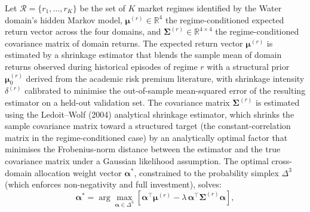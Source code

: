 \documentclass[12pt,openany]{book}
\numberwithin{equation}{chapter}
\theoremstyle{plain}
\theoremstyle{definition}
\theoremstyle{remark}
\begin{document}
Let $\mathcal{R} = \{r_1, \ldots, r_K\}$ be the set of $K$ market regimes identified by the Water domain's hidden Markov model, $\boldsymbol{\mu}^{(r)} \in \mathbb{R}^4$ the regime-conditioned expected return vector across the four domains, and $\boldsymbol{\Sigma}^{(r)} \in \mathbb{R}^{4 \times 4}$ the regime-conditioned covariance matrix of domain returns. The expected return vector $\boldsymbol{\mu}^{(r)}$ is estimated by a shrinkage estimator that blends the sample mean of domain returns observed during historical episodes of regime $r$ with a structural prior $\boldsymbol{\mu}_0^{(r)}$ derived from the academic risk premium literature, with shrinkage intensity $\delta^{(r)}$ calibrated to minimise the out-of-sample mean-squared error of the resulting estimator on a held-out validation set. The covariance matrix $\boldsymbol{\Sigma}^{(r)}$ is estimated using the Ledoit--Wolf (2004) analytical shrinkage estimator, which shrinks the sample covariance matrix toward a structured target (the constant-correlation matrix in the regime-conditioned case) by an analytically optimal factor that minimises the Frobenius-norm distance between the estimator and the true covariance matrix under a Gaussian likelihood assumption. The optimal cross-domain allocation weight vector $\boldsymbol{\alpha}^{*}$, constrained to the probability simplex $\Delta^3$ (which enforces non-negativity and full investment), solves:
\begin{equation}
    \boldsymbol{\alpha}^{*} = \arg\max_{\boldsymbol{\alpha} \in \Delta^3}
    \left[
        \boldsymbol{\alpha}^\top \boldsymbol{\mu}^{(r)}
        - \lambda\, \boldsymbol{\alpha}^\top \boldsymbol{\Sigma}^{(r)} \boldsymbol{\alpha}
    \right],
    \label{eq:cross_domain_alloc}
\end{equation}
\end{document}
